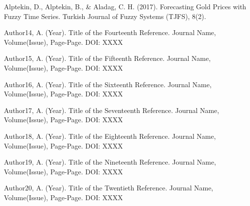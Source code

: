 \documentclass[conference]{IEEEtran}
\begin{document}
\begin{thebibliography}{00}
 Alptekin, D., Alptekin, B., \& Aladag, C. H. (2017). Forecasting Gold Prices with Fuzzy Time Series. Turkish Journal of Fuzzy Systems (TJFS), 8(2).

 Author14, A. (Year). Title of the Fourteenth Reference. Journal Name, Volume(Issue), Page-Page. DOI: XXXX

 Author15, A. (Year). Title of the Fifteenth Reference. Journal Name, Volume(Issue), Page-Page. DOI: XXXX

 Author16, A. (Year). Title of the Sixteenth Reference. Journal Name, Volume(Issue), Page-Page. DOI: XXXX

 Author17, A. (Year). Title of the Seventeenth Reference. Journal Name, Volume(Issue), Page-Page. DOI: XXXX

 Author18, A. (Year). Title of the Eighteenth Reference. Journal Name, Volume(Issue), Page-Page. DOI: XXXX

 Author19, A. (Year). Title of the Nineteenth Reference. Journal Name, Volume(Issue), Page-Page. DOI: XXXX

 Author20, A. (Year). Title of the Twentieth Reference. Journal Name, Volume(Issue), Page-Page. DOI: XXXX



\end{thebibliography}
\end{document}
